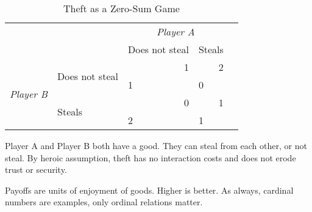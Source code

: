 \begin{table}
	\caption[The Theft Game]{Theft as a Zero-Sum Game}
	\label{tab:theft}
	\begin{center}
	\begin{tabular}
		{m{1cm}
		m{}
		m{}
		m{}
		m{}}
	
		
& %
& \multicolumn{2}{c}{\emph{Player A}} 
\\


& %
&Does not steal 
&Steals
\\ 

\cline{3-4}

\multicolumn{1}{c}{\multirow{4}{*}{\emph{Player B}}} 
& \multirow{2}{2,3cm}{Does not steal} 
& 	\multicolumn{1}{|r|}{1} 
& \multicolumn{1}{r|}{2}
\\ 


\multicolumn{1}{c}{} 
& \multicolumn{1}{c}{}
& \multicolumn{1}{|l|}{1} 
& \multicolumn{1}{l|}{0}
\\ 

\cline{3-4}

\multicolumn{1}{c}{} 
& \multirow{2}{2,3cm}{Steals} 
& \multicolumn{1}{|r|}{0} 
& \multicolumn{1}{r|}{1}
\\ 


\multicolumn{1}{c}{} 
& \multicolumn{1}{c}{}
& \multicolumn{1}{|l|}{2} 
& \multicolumn{1}{l|}{1}
\\ 

\cline{3-4}

\end{tabular}
\end{center}

	\scriptsize{
		Player A and Player B both have a good. 
		They can steal from each other, or not steal. 
		By heroic assumption, theft has no interaction costs and does not erode trust or security.
		
		Payoffs are units of enjoyment of goods. 
		Higher is better. 
		As always, cardinal numbers are examples, only ordinal relations matter.}
\end{table}


